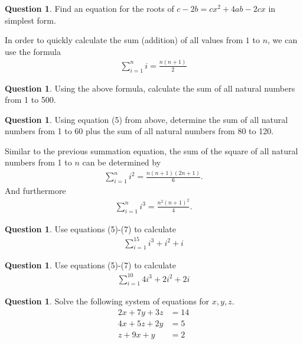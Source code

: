 \documentclass[12pt]{article}
\theoremstyle{definition}
\newtheorem{question}[thm]{Question}
\begin{document}
\vspace{3cm}

\begin{question}
	Find an equation for the roots of $c-2b=cx^2+4ab-2cx$ in simplest form.
\end{question}

\vspace{3cm}

In order to quickly calculate the sum (addition) of all values from $1$ to $n$, we can use the formula
\begin{align}
\sum_{i=1}^{n}i=\frac{n(n+1)}{2}
\end{align}
\begin{question}
	Using the above formula, calculate the sum of all natural numbers from 1 to 500.
\end{question}

\vspace{3cm}

\begin{question}
	Using equation (5) from above, determine the sum of all natural numbers from 1 to 60 plus the sum of all natural numbers from 80 to 120.
\end{question}

\newpage
Similar to the previous summation equation, the sum of the square of all natural numbers from 1 to $n$ can be determined by
\begin{align}
\sum_{i=1}^{n}i^2=\frac{n(n+1)(2n+1)}{6}.
\end{align}
And furthermore
\begin{align}
\sum_{i=1}^{n}i^3=\frac{n^2(n+1)^2}{4}.
\end{align}
\begin{question}
	Use equations (5)-(7) to calculate 
	\begin{align}
	\sum_{i=1}^{15}i^3+i^2+i
	\end{align}
\end{question}

\vspace{2cm}

\begin{question}
	Use equations (5)-(7) to calculate 
	\begin{align}
	\sum_{i=1}^{10}4i^3+2i^2+2i
	\end{align}
\end{question}

\vspace{2cm}
	\begin{question}
Solve the following system of equations for $x,y,z$.
\begin{align}
2x+7y+3z&=14 \\
4x+5z+2y&=5 \\
z+9x+y&=2
\end{align}
\end{question}


\end{document}
